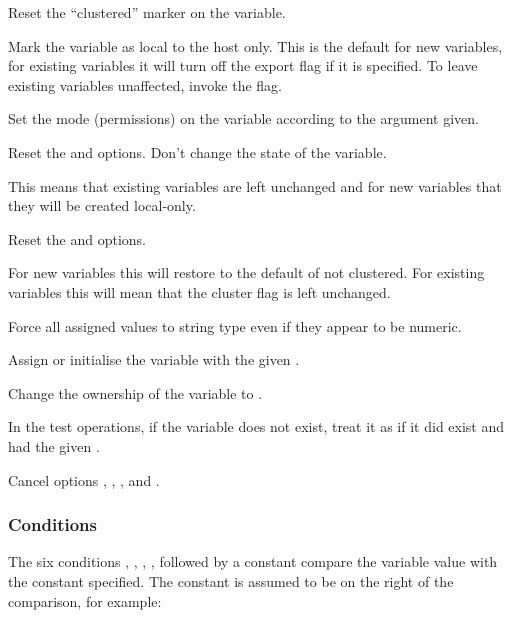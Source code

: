 Reset the ``clustered'' marker on the variable.


Mark the variable as local to the host only. This is the default for new variables, for existing variables it will turn off the
export flag if it is specified. To leave existing variables unaffected, invoke the  flag.


Set the mode (permissions) on the variable according to the  argument given.


Reset the  and  options. Don't change the state of the variable.

This means that existing variables are left unchanged and for new variables that they will be created local-only.


Reset the  and  options.

For new variables this will restore to the default of not clustered. For existing variables this will mean that the cluster flag is left unchanged.


Force all assigned values to string type even if they appear to be numeric.


Assign or initialise the variable with the given .


Change the ownership of the variable to .


In the test operations, if the variable does not exist, treat it as if it did exist and had the given .


Cancel options , , ,  and .

\freezeopts{\filename{\BtvarVarname}}{}

\subsubsection{Conditions}
The six conditions , , , ,  followed by
a constant compare the variable value with the constant specified. The constant is assumed to be on the right of the comparison, for example:

